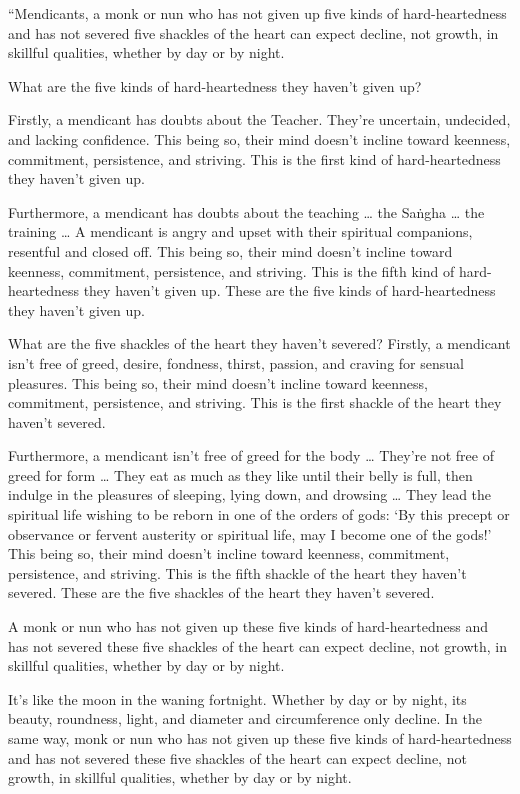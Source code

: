 \documentclass[12pt,openany]{book}%
\begin{document}
“Mendicants, a monk or nun who has not given up five kinds of hard-heartedness and has not severed five shackles of the heart can expect decline, not growth, in skillful qualities, whether by day or by night. 

What are the five kinds of hard-heartedness they haven’t given up? 

Firstly, a mendicant has doubts about the Teacher. They’re uncertain, undecided, and lacking confidence. This being so, their mind doesn’t incline toward keenness, commitment, persistence, and striving. This is the first kind of hard-heartedness they haven’t given up. 

Furthermore, a mendicant has doubts about the teaching … the \textsanskrit{Saṅgha} … the training … A mendicant is angry and upset with their spiritual companions, resentful and closed off. This being so, their mind doesn’t incline toward keenness, commitment, persistence, and striving. This is the fifth kind of hard-heartedness they haven’t given up. These are the five kinds of hard-heartedness they haven’t given up. 

What are the five shackles of the heart they haven’t severed? Firstly, a mendicant isn’t free of greed, desire, fondness, thirst, passion, and craving for sensual pleasures. This being so, their mind doesn’t incline toward keenness, commitment, persistence, and striving. This is the first shackle of the heart they haven’t severed. 

Furthermore, a mendicant isn’t free of greed for the body … They’re not free of greed for form … They eat as much as they like until their belly is full, then indulge in the pleasures of sleeping, lying down, and drowsing … They lead the spiritual life wishing to be reborn in one of the orders of gods: ‘By this precept or observance or fervent austerity or spiritual life, may I become one of the gods!’ This being so, their mind doesn’t incline toward keenness, commitment, persistence, and striving. This is the fifth shackle of the heart they haven’t severed. These are the five shackles of the heart they haven’t severed. 

A monk or nun who has not given up these five kinds of hard-heartedness and has not severed these five shackles of the heart can expect decline, not growth, in skillful qualities, whether by day or by night. 

It’s like the moon in the waning fortnight. Whether by day or by night, its beauty, roundness, light, and diameter and circumference only decline. In the same way, monk or nun who has not given up these five kinds of hard-heartedness and has not severed these five shackles of the heart can expect decline, not growth, in skillful qualities, whether by day or by night. 
\end{document}
